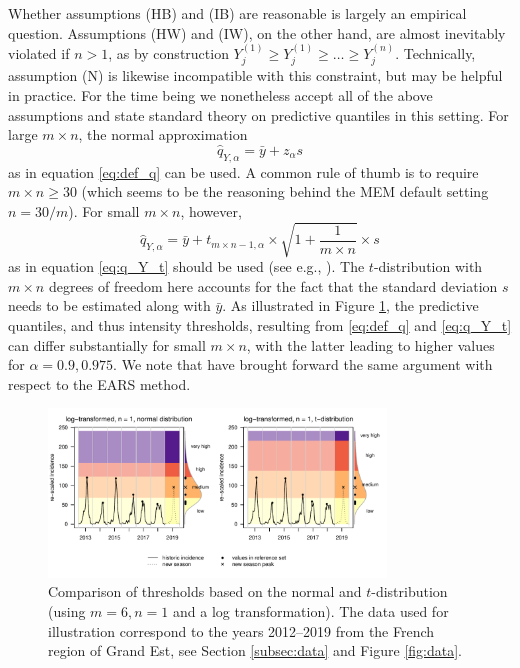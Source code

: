 \documentclass[12pt]{article}
\newcommand{\sd}{s}
\begin{document}
Whether assumptions (HB) and (IB) are reasonable is largely an empirical question. Assumptions (HW) and (IW), on the other hand, are almost inevitably violated if $n > 1$, as by construction $Y_j^{(1)} \geq Y_j^{(1)} \geq \dots \geq Y_j^{(n)}$. Technically, assumption (N) is likewise incompatible with this constraint, but may be helpful in practice.  For the time being we nonetheless accept all of the above assumptions and state standard theory on predictive quantiles in this setting. For large $m\times n$, the normal approximation
$$
\hat{q}_{Y, \alpha} = \bar{y} + z_\alpha \sd
$$
as in equation \eqref{eq:def_q} can be used. A common rule of thumb is to require $m \times n \geq 30$ (which seems to be the reasoning behind the MEM default setting $n = 30/m$). For small $m \times n$, however,
\begin{equation*}
\hat{q}_{Y, \alpha} = \bar{y} + t_{m\times n - 1, \alpha} \times \sqrt{1 + \frac{1}{m\times n}} \times s
\end{equation*}
as in equation \eqref{eq:q_Y_t} should be used (see e.g., \citealt{Preston2000}). The $t$-distribution with $m \times n$ degrees of freedom here accounts for the fact that the standard deviation $s$ needs to be estimated along with $\bar{y}$. As illustrated in Figure \ref{fig:illustration_t}, the predictive quantiles, and thus intensity thresholds, resulting from \eqref{eq:def_q} and \eqref{eq:q_Y_t} can differ substantially for small $m \times n$, with the latter leading to higher values for $\alpha = 0.9, 0.975$. We note that \cite{Allevius2020} have brought forward the same argument with respect to the EARS method.


\begin{figure}
\begin{center}
\includegraphics[width = 0.8\textwidth, trim={0 5mm 0 0},clip]{figure/illustration_t_normal.pdf}
\end{center}
\caption{Comparison of thresholds based on the normal and $t$-distribution (using $m = 6, n = 1$ and a log transformation). The data used for illustration correspond to the years 2012--2019 from the French region of Grand Est, see Section \ref{subsec:data} and Figure \ref{fig:data}.}
\label{fig:illustration_t}
\end{figure}
\end{document}
